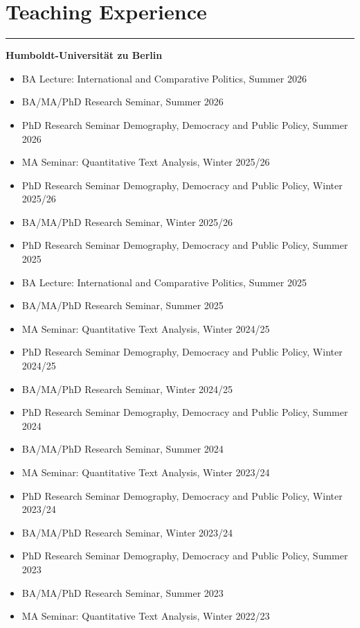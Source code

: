 \section*{Teaching Experience}\vspace{-2em}\rule{\textwidth}{0.5pt}\vspace{1em}
\textbf{Humboldt-Universität zu Berlin}
\begin{itemize}[topsep=0pt, noitemsep, leftmargin=3]
	\item BA Lecture: International and Comparative Politics, Summer 2026
    \item BA/MA/PhD Research Seminar, Summer 2026
    \item PhD Research Seminar Demography, Democracy and Public Policy, Summer 2026
    \item MA Seminar: Quantitative Text Analysis, Winter 2025/26
	\item PhD Research Seminar Demography, Democracy and Public Policy, Winter 2025/26
	\item BA/MA/PhD Research Seminar, Winter 2025/26
    \item PhD Research Seminar Demography, Democracy and Public Policy, Summer 2025
	\item BA Lecture: International and Comparative Politics, Summer 2025
    \item BA/MA/PhD Research Seminar, Summer 2025
    \item MA Seminar: Quantitative Text Analysis, Winter 2024/25
	\item PhD Research Seminar Demography, Democracy and Public Policy, Winter 2024/25
	\item BA/MA/PhD Research Seminar, Winter 2024/25
    \item PhD Research Seminar Demography, Democracy and Public Policy, Summer 2024
    \item BA/MA/PhD Research Seminar, Summer 2024
	\item MA Seminar: Quantitative Text Analysis, Winter 2023/24
	\item PhD Research Seminar Demography, Democracy and Public Policy, Winter 2023/24
	\item BA/MA/PhD Research Seminar, Winter 2023/24
	\item PhD Research Seminar Demography, Democracy and Public Policy, Summer 2023
	\item BA/MA/PhD Research Seminar, Summer 2023
	\item MA Seminar: Quantitative Text Analysis, Winter 2022/23

\end{itemize}
